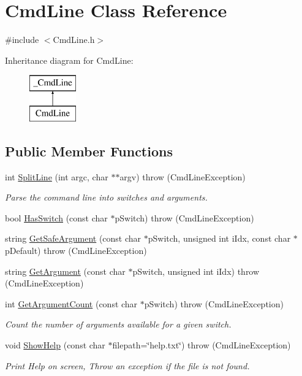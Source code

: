 \hypertarget{class_cmd_line}{}\section{Cmd\+Line Class Reference}
\label{class_cmd_line}


{\ttfamily \#include $<$Cmd\+Line.\+h$>$}

Inheritance diagram for Cmd\+Line\+:\begin{figure}[H]
\begin{center}
\leavevmode
\includegraphics[height=2.000000cm]{d3/d1f/class_cmd_line}
\end{center}
\end{figure}
\subsection*{Public Member Functions}
\begin{DoxyCompactItemize}
\item 
int \hyperlink{class_cmd_line_a923ce2f672cfcca6371c8357a8467991}{Split\+Line} (int argc, char $\ast$$\ast$argv)  throw (\+Cmd\+Line\+Exception)
\begin{DoxyCompactList}\small\item\em Parse the command line into switches and arguments. \end{DoxyCompactList}\item 
bool \hyperlink{class_cmd_line_a213a04b873d1ad52b302616259b4cc9a}{Has\+Switch} (const char $\ast$p\+Switch)  throw (\+Cmd\+Line\+Exception)
\item 
string \hyperlink{class_cmd_line_ae682b8f3d82279e9dc3a5738a20211d4}{Get\+Safe\+Argument} (const char $\ast$p\+Switch, unsigned int i\+Idx, const char $\ast$p\+Default)  throw (\+Cmd\+Line\+Exception)
\item 
string \hyperlink{class_cmd_line_a49676ecdd22000a62d139481ae847c99}{Get\+Argument} (const char $\ast$p\+Switch, unsigned int i\+Idx)  throw (\+Cmd\+Line\+Exception)
\item 
int \hyperlink{class_cmd_line_ab9795ce82b542b37872313ac7b782e65}{Get\+Argument\+Count} (const char $\ast$p\+Switch)  throw (\+Cmd\+Line\+Exception)
\begin{DoxyCompactList}\small\item\em Count the number of arguments available for a given switch. \end{DoxyCompactList}\item 
void \hyperlink{class_cmd_line_a02c22f5a022873be563b082f8fb57a51}{Show\+Help} (const char $\ast$filepath=\char`\"{}help.\+txt\char`\"{})  throw (\+Cmd\+Line\+Exception)
\begin{DoxyCompactList}\small\item\em Print Help on screen, Throw an exception if the file is not found. \end{DoxyCompactList}\end{DoxyCompactItemize}
